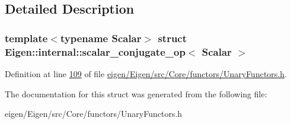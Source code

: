 \subsection{Detailed Description}
\subsubsection*{template$<$typename Scalar$>$\newline
struct Eigen\+::internal\+::scalar\+\_\+conjugate\+\_\+op$<$ Scalar $>$}



Definition at line \hyperlink{eigen_2_eigen_2src_2_core_2functors_2_unary_functors_8h_source_l00109}{109} of file \hyperlink{eigen_2_eigen_2src_2_core_2functors_2_unary_functors_8h_source}{eigen/\+Eigen/src/\+Core/functors/\+Unary\+Functors.\+h}.



The documentation for this struct was generated from the following file\+:\begin{DoxyCompactItemize}
\item 
eigen/\+Eigen/src/\+Core/functors/\+Unary\+Functors.\+h\end{DoxyCompactItemize}
